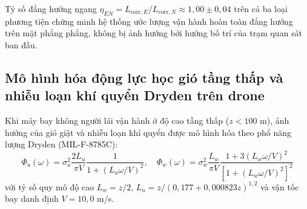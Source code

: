 \begin{table}[H]
\centering
\caption{Khoảng cách tương quan không gian và hệ số đẳng hướng trên ba trục tọa độ}
\label{tab:spatial-correlation-lengths}
\end{table}

Tỷ số đẳng hướng ngang $\eta_{EN} = L_{\text{corr}, E} / L_{\text{corr}, N} \approx 1{,}00 \pm 0{,}04$ trên cả ba loại phương tiện chứng minh hệ thống ước lượng vận hành hoàn toàn đẳng hướng trên mặt phẳng phẳng, không bị ảnh hưởng bởi hướng bố trí của trạm quan sát ban đầu.

\subsection{Mô hình hóa động lực học gió tầng thấp và nhiễu loạn khí quyển Dryden trên drone}

\hspace{0.5cm} Khi máy bay không người lái vận hành ở độ cao tầng thấp ($z < 100$ m), ảnh hưởng của gió giật và nhiễu loạn khí quyển được mô hình hóa theo phổ năng lượng Dryden (MIL-F-8785C):
\begin{equation}
\Phi_u(\omega) = \sigma_u^2 \frac{2 L_u}{\pi V} \frac{1}{1 + (L_u \omega / V)^2}, \quad \Phi_w(\omega) = \sigma_w^2 \frac{L_w}{\pi V} \frac{1 + 3(L_w \omega / V)^2}{[1 + (L_w \omega / V)^2]^2}
\label{eq:dryden-wind-turbulence-spectra}
\end{equation}
với tỷ số quy mô độ cao $L_w = z / 2$, $L_u = z / (0{,}177 + 0{,}000823 z)^{1{,}2}$ và vận tốc bay danh định $V = 10{,}0$ m/s.

